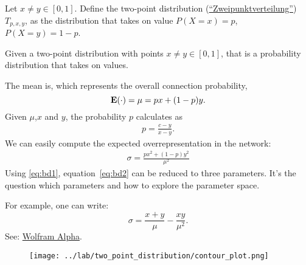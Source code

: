
Let $x \neq y \in [0,1]$. Define the two-point distribution (\href{https://de.wikipedia.org/wiki/Zweipunktverteilung}{\enquote{Zweipunktverteilung}}) $T_{p,x,y}$, as the distribution that takes on value $P(X=x)=p$, $P(X=y) = 1-p$. 

Given a two-point distribution with points $x \neq y \in [0,1]$, that is a probability distribution that takes on values.

The mean is, which represents the overall connection probability,
\[
\operatorname{\mathbf{E}}(\cdot) = \mu = px + (1-p)y.
\]
Given $\mu$,$x$ and $y$, the probability $p$ calculates as
\begin{align}
  p = \frac{c-y}{x-y}. \label{eq:bd1}
\end{align}
We can easily compute the expected overrepresentation in the network:
\begin{align}
  \sigma = \frac{p x^2 + (1-p) y^2}{\mu^2} \label{eq:bd2}
\end{align}
Using \eqref{eq:bd1}, equation~\eqref{eq:bd2} can be reduced to three parameters. It's the question which parameters and how to explore the parameter space.

For example, one can write:
\[
\sigma = \frac{x+y}{\mu} - \frac{xy}{\mu^2}.
\]
See: \href{https://www.wolframalpha.com/input/?i=Simplify[%28%28%28c-y%29%2F%28x-y%29%29*x^2%2B%281-%28%28c-y%29%2F%28x-y%29%29%29*y^2%29%2Fc^2]}{Wolfram Alpha}.

\begin{figure}[h!]
\centering
\texttt{[image: ../lab/two\_point\_distribution/contour\_plot.png]}
\end{figure}


